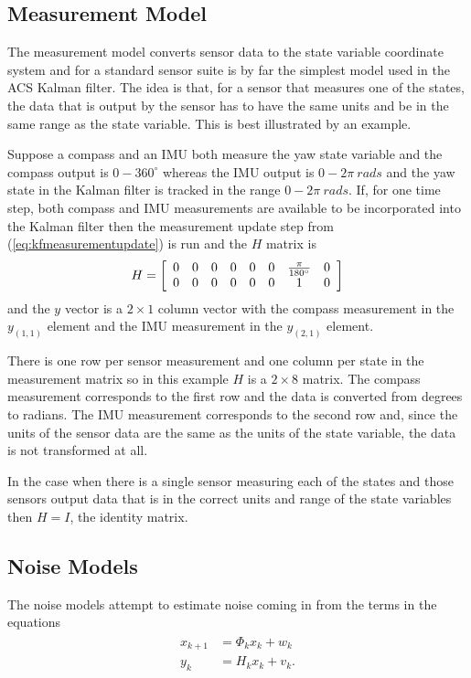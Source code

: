 \subsection{Measurement Model}
\label{sec:kfMeasurementModel}
The measurement model converts sensor data to the state variable coordinate system and for a standard sensor suite is by far the simplest model used in the ACS Kalman filter. The idea is that, for a sensor that measures one of the states, the data that is output by the sensor has to have the same units and be in the same range as the state variable. This is best illustrated by an example.

Suppose a compass and an IMU both measure the yaw state variable and the compass output is $0 - 360^\circ$ whereas the IMU output is $0 - 2\pi~rads$ and the yaw state in the Kalman filter is tracked in the range $0 - 2\pi ~ rads$. If, for one time step, both compass and IMU measurements are available to be incorporated into the Kalman filter then the measurement update step from (\ref{eq:kfmeasurementupdate}) is run and the $H$ matrix is
\begin{align*}
H = \left[\begin{array}{c c c c c c c c}
0 & 0 & 0 & 0 & 0 & 0 & \frac{\pi}{180^\circ} & 0 \\
0 & 0 & 0 & 0 & 0 & 0 & 1 & 0
\end{array}\right]
\end{align*}
and the $y$ vector is a $2\times1$ column vector with the compass measurement in the $y_{(1,1)}$ element and the IMU measurement in the $y_{(2,1)}$ element.

There is one row per sensor measurement and one column per state in the measurement matrix so in this example $H$ is a $2\times8$ matrix. The compass measurement corresponds to the first row and the data is converted from degrees to radians. The IMU measurement corresponds to the second row and, since the units of the sensor data are the same as the units of the state variable, the data is not transformed at all.

In the case when there is a single sensor measuring each of the states and those sensors output data that is in the correct units and range of the state variables then $H=I$, the identity matrix.

\subsection{Noise Models}
\label{sec:kfNoiseModels}
The noise models attempt to estimate noise coming in from the terms in the equations
\begin{align*}
\begin{split}
x_{k+1} &= \Phi_kx_k + w_k \\
y_k &= H_kx_k + v_k.
\end{split}
\end{align*}

